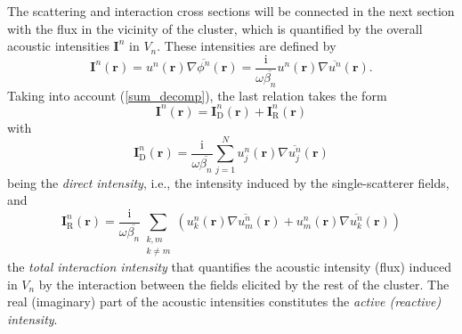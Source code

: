 \documentclass{article}
\begin{document}
The scattering and interaction cross sections will be connected in the next section with the flux in the vicinity of the cluster, which is quantified by the overall acoustic intensities $\mathbf{I}^{n}$ in $V_n$. These intensities are defined by
%
\begin{equation}
    \mathbf{I}^{n}(\mathbf{r})=u^{n}(\mathbf{r})\nabla\overline{\phi^{n}}(\mathbf{r})=\frac{\mathrm{i}}{\omega\overline{\beta_n}}u^{n}(\mathbf{r})\nabla\overline{u^{n}}(\mathbf{r}).
\end{equation}
%
Taking into account (\ref{sum_decomp}), the last relation takes the form
%
\begin{equation}\label{intensity_decomp}
    \mathbf{I}^{n}(\mathbf{r})=\mathbf{I}_\mathrm{D}^n(\mathbf{r})+\mathbf{I}_\mathrm{R}^n(\mathbf{r})
\end{equation}
%
with
\begin{equation}
    \label{direct_intensity}
    \mathbf{I}_\mathrm{D}^n(\mathbf{r})=\frac{\mathrm{i}}{\omega\overline{\beta_n}}\sum_{j=1}^{N}u_j^{n}(\mathbf{r})\nabla\overline{u_j^{n}}(\mathbf{r})
\end{equation}
%
being the \emph{direct intensity}, i.e., the intensity induced by the single-scatterer fields, and
%
\begin{equation}
    \label{reaction_intensity}
    \mathbf{I}_{\mathrm{R}}^n(\mathbf{r})=\frac{\mathrm{i}}{\omega\overline{\beta_n}}\sum_{\substack{k,m\\k\ne m}}\left(u_k^{n}(\mathbf{r})\nabla\overline{u_m^{n}}(\mathbf{r})+u_m^{n}(\mathbf{r})\nabla\overline{u_k^{n}}(\mathbf{r})\right)
\end{equation}
%
the \emph{total interaction intensity} that quantifies the acoustic intensity (flux) induced in $V_n$ by the interaction between the fields elicited by the rest of the cluster. The real (imaginary) part of the acoustic intensities constitutes the \emph{active (reactive) intensity}.
%
%
\end{document}
